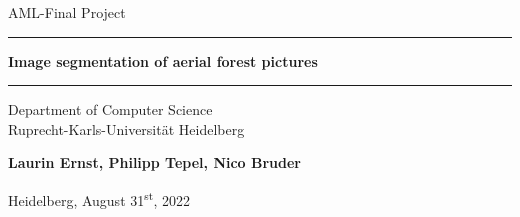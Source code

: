 \begin{titlepage}
    \begin{center}
        
    \LARGE
    AML-Final Project

    \vspace{0.5cm}
          
    \rule{\textwidth}{1.5pt}
    \LARGE
    \textbf{Image segmentation of aerial forest pictures}
    \rule{\textwidth}{1.5pt}
       
    \vspace{0.5cm}
          
    \large
    Department of Computer Science \\
    Ruprecht-Karls-Universität Heidelberg
    \vfill
    
    \Large
    \textbf{Laurin Ernst, Philipp Tepel, Nico Bruder}
    
    \vfill
    
    \large
    Heidelberg, August 31\textsuperscript{st}, 2022
          
    \vfill
    
    \end{center}
    \end{titlepage}